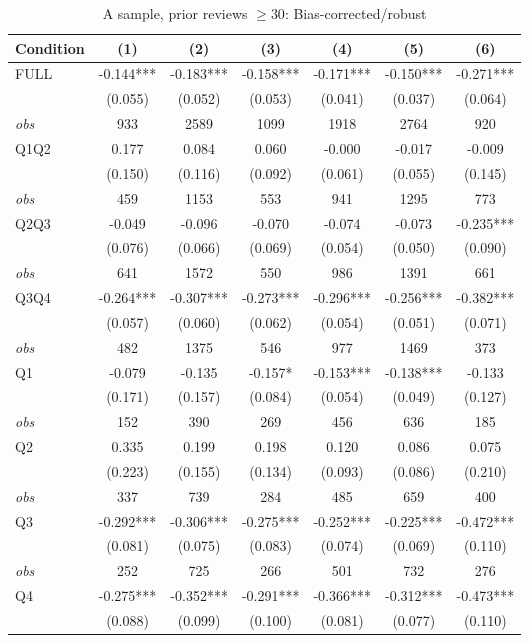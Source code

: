\begin{table}[!htbp]
\centering
\caption{A sample, prior reviews $\geq30$: Bias-corrected/robust}
\begin{tabular}{lcccccc}
\toprule
Condition & (1) & (2) & (3) & (4) & (5) & (6) \\
\midrule
FULL & -0.144*** & -0.183*** & -0.158*** & -0.171*** & -0.150*** & -0.271*** \\
 & (0.055) & (0.052) & (0.053) & (0.041) & (0.037) & (0.064) \\
\textit{obs} & 933 & 2589 & 1099 & 1918 & 2764 & 920 \\
Q1Q2 & 0.177 & 0.084 & 0.060 & -0.000 & -0.017 & -0.009 \\
 & (0.150) & (0.116) & (0.092) & (0.061) & (0.055) & (0.145) \\
\textit{obs} & 459 & 1153 & 553 & 941 & 1295 & 773 \\
Q2Q3 & -0.049 & -0.096 & -0.070 & -0.074 & -0.073 & -0.235*** \\
 & (0.076) & (0.066) & (0.069) & (0.054) & (0.050) & (0.090) \\
\textit{obs} & 641 & 1572 & 550 & 986 & 1391 & 661 \\
Q3Q4 & -0.264*** & -0.307*** & -0.273*** & -0.296*** & -0.256*** & -0.382*** \\
 & (0.057) & (0.060) & (0.062) & (0.054) & (0.051) & (0.071) \\
\textit{obs} & 482 & 1375 & 546 & 977 & 1469 & 373 \\
Q1 & -0.079 & -0.135 & -0.157* & -0.153*** & -0.138*** & -0.133 \\
 & (0.171) & (0.157) & (0.084) & (0.054) & (0.049) & (0.127) \\
\textit{obs} & 152 & 390 & 269 & 456 & 636 & 185 \\
Q2 & 0.335 & 0.199 & 0.198 & 0.120 & 0.086 & 0.075 \\
 & (0.223) & (0.155) & (0.134) & (0.093) & (0.086) & (0.210) \\
\textit{obs} & 337 & 739 & 284 & 485 & 659 & 400 \\
Q3 & -0.292*** & -0.306*** & -0.275*** & -0.252*** & -0.225*** & -0.472*** \\
 & (0.081) & (0.075) & (0.083) & (0.074) & (0.069) & (0.110) \\
\textit{obs} & 252 & 725 & 266 & 501 & 732 & 276 \\
Q4 & -0.275*** & -0.352*** & -0.291*** & -0.366*** & -0.312*** & -0.473*** \\
 & (0.088) & (0.099) & (0.100) & (0.081) & (0.077) & (0.110) \\

\end{tabular}
\end{table}
